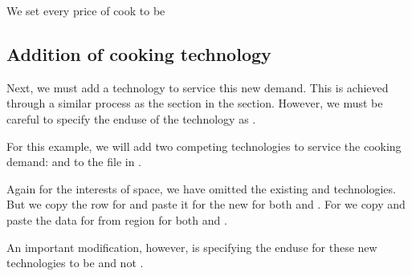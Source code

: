 \documentclass[letterpaper,10pt,english]{sphinxmanual}
\begin{document}
We set every price of cook to be 


\subsection{Addition of cooking technology}
\label{\detokenize{user-guide/addition-service-demand:Addition-of-cooking-technology}}
Next, we must add a technology to service this new demand. This is achieved through a similar process as the section in the {\hyperref[\detokenize{user-guide/add-solar::doc}]{}} section. However, we must be careful to specify the end\sphinxhyphen{}use of the technology as .

For this example, we will add two competing technologies to service the cooking demand:  and  to the  file in .

Again for the interests of space, we have omitted the existing  and  technologies. But we copy the  row for  and paste it for the new  for both  and . For  we copy and paste the data for  from region  for both  and .

An important modification, however, is specifying the end\sphinxhyphen{}use for these new technologies to be  and not .
\end{document}
